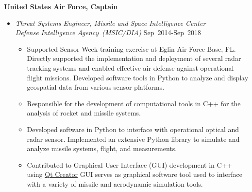 \textbf{United States Air Force, Captain}
\begin{itemize}

\item[] \textit{Threat Systems Engineer, Missile and Space Intelligence Center \\
                Defense Intelligence Agency~(MSIC/DIA)}
                \hfill {Sep~2014-Sep~2018}
\begin{itemize}
    \item Supported Sensor Week training exercise at Eglin Air Force Base, FL.
    Directly supported the implementation and deployment of several radar tracking systems and enabled effective air defense against operational flight missions.
    Developed software tools in Python to analyze and display geospatial data from various sensor platforms.
    \item Responsible for the development of computational tools in C++ for the analysis of rocket and missile systems.
    \item Developed software in Python to interface with operational optical and radar sensor.
    Implemented an extensive Python library to simulate and analyze missile systems, flight, and measurements. 
    \item Contributed to Graphical User Interface (GUI) development in C++ using \href{https://www.qt.io/ide/}{Qt Creator}
    GUI serves as graphical software tool used to interface with a variety of missile and aerodynamic simulation tools.
\end{itemize}
        

\end{itemize}
